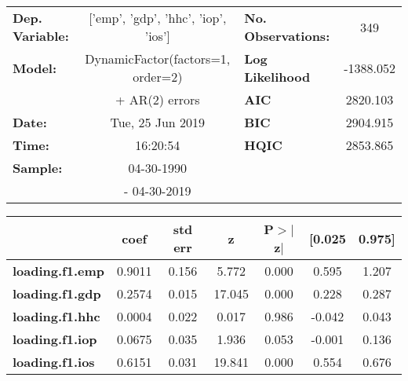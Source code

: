 \begin{center}
\begin{tabular}{lclc}
\toprule
\textbf{Dep. Variable:}          & ['emp', 'gdp', 'hhc', 'iop', 'ios']  & \textbf{  No. Observations:  } &                  349                   \\
\textbf{Model:}                  &  DynamicFactor(factors=1, order=2)   & \textbf{  Log Likelihood     } &               -1388.052                \\
\textbf{}                        &            + AR(2) errors            & \textbf{  AIC                } &                2820.103                \\
\textbf{Date:}                   &           Tue, 25 Jun 2019           & \textbf{  BIC                } &                2904.915                \\
\textbf{Time:}                   &               16:20:54               & \textbf{  HQIC               } &                2853.865                \\
\textbf{Sample:}                 &              04-30-1990              & \textbf{                     } &                                        \\
\textbf{}                        &             - 04-30-2019             & \textbf{                     } &                                        \\
\bottomrule
\end{tabular}
\begin{tabular}{lcccccc}
                          & \textbf{coef} & \textbf{std err} & \textbf{z} & \textbf{P$>$$|$z$|$} & \textbf{[0.025} & \textbf{0.975]}  \\
\midrule
\textbf{loading.f1.emp}   &       0.9011  &        0.156     &     5.772  &         0.000        &        0.595    &        1.207     \\
\textbf{loading.f1.gdp}   &       0.2574  &        0.015     &    17.045  &         0.000        &        0.228    &        0.287     \\
\textbf{loading.f1.hhc}   &       0.0004  &        0.022     &     0.017  &         0.986        &       -0.042    &        0.043     \\
\textbf{loading.f1.iop}   &       0.0675  &        0.035     &     1.936  &         0.053        &       -0.001    &        0.136     \\
\textbf{loading.f1.ios}   &       0.6151  &        0.031     &    19.841  &         0.000        &        0.554    &        0.676     \\

\end{tabular}
\end{center}

